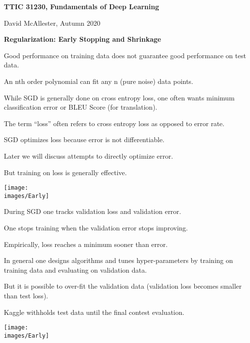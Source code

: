 





{\Huge


\centerline{\bf TTIC 31230, Fundamentals of Deep Learning}
\bigskip
\centerline{David McAllester, Autumn 2020}

\vfill
\centerline{\bf Regularization: Early Stopping and Shrinkage}
\vfill
\vfill


Good performance on training data does not guarantee good performance on test data.

\vfill
An nth order polynomial can fit any n (pure noise) data points.


While SGD is generally done on cross entropy loss, one often wants minimum classification error or BLEU Score (for translation).

\vfill
The term ``loss'' often refers to cross entropy loss as opposed to error rate.

\vfill
SGD optimizes loss because error is not differentiable.

\vfill
Later we will discuss attempts to directly optimize error.

\vfill
But training on loss is generally effective.



\centerline{\texttt{[image: \\images/Early]}}

\vfill
During SGD one tracks validation loss and validation error.

\vfill
One stops training when the validation error stops improving.

\vfill
Empirically, loss reaches a minimum sooner than error.


In general one designs algorithms and tunes hyper-parameters by training on training data and evaluating on validation data.

\vfill
But it is possible to over-fit the validation data (validation loss becomes smaller than test loss).

\vfill
Kaggle withholds test data until the final contest evaluation.



\centerline{\texttt{[image: \\images/Early]}}

}
